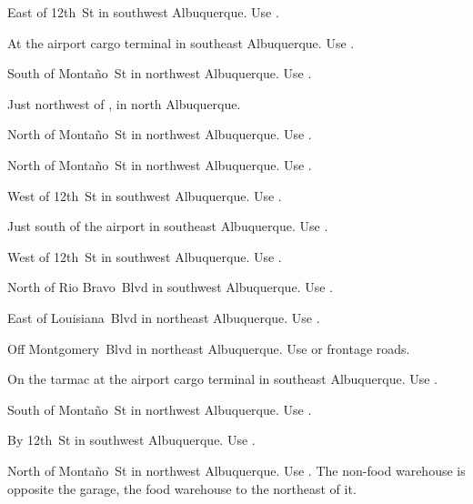 
\begin{LocationList}

East of 12th~St in southwest Albuquerque.
Use  .

At the airport cargo terminal in southeast Albuquerque.
Use  .

South of Monta\~no~St in northwest Albuquerque.
Use  .

Just northwest of  , in north Albuquerque.

\Location{\GarageHQ \Garage}
North of Monta\~no~St in northwest Albuquerque.
Use  .

North of Monta\~no~St in northwest Albuquerque.
Use  .

West of 12th~St in southwest Albuquerque.
Use  .

Just south of the airport in southeast Albuquerque.
Use  .

West of 12th~St in southwest Albuquerque.
Use  .

North of Rio Bravo~Blvd in southwest Albuquerque.
Use  .

East of Louisiana~Blvd in northeast Albuquerque.
Use  .

\Location{\TruckStop \Gas \Rest}
Off Montgomery~Blvd in northeast Albuquerque.
Use   or frontage roads.

On the tarmac at the airport cargo terminal in southeast Albuquerque.
Use  .

South of Monta\~no~St in northwest Albuquerque.
Use  .

By 12th~St in southwest Albuquerque.
Use  .

North of Monta\~no~St in northwest Albuquerque. Use  .
The non-food warehouse is opposite the garage, the food warehouse to the northeast of it.

\end{LocationList}


